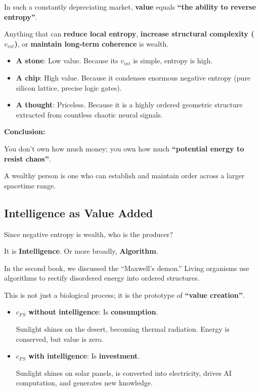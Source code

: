In such a constantly depreciating market, \textbf{value} equals \textbf{``the ability to reverse entropy''}.

Anything that can \textbf{reduce local entropy}, \textbf{increase structural complexity ($v_{int}$)}, or \textbf{maintain long-term coherence} is wealth.

\begin{itemize}
\item \textbf{A stone}: Low value. Because its $v_{int}$ is simple, entropy is high.

\item \textbf{A chip}: High value. Because it condenses enormous negative entropy (pure silicon lattice, precise logic gates).

\item \textbf{A thought}: Priceless. Because it is a highly ordered geometric structure extracted from countless chaotic neural signals.
\end{itemize}

\textbf{Conclusion:}

You don't own how much money; you own how much \textbf{``potential energy to resist chaos''}.

A wealthy person is one who can establish and maintain order across a larger spacetime range.

\subsection{Intelligence as Value Added}

Since negative entropy is wealth, who is the producer?

It is \textbf{Intelligence}. Or more broadly, \textbf{Algorithm}.

In the second book, we discussed the ``Maxwell's demon.'' Living organisms use algorithms to rectify disordered energy into ordered structures.

This is not just a biological process; it is the prototype of \textbf{``value creation''}.

\begin{itemize}
\item \textbf{$c_{FS}$ without intelligence}: Is \textbf{consumption}.

    Sunlight shines on the desert, becoming thermal radiation. Energy is conserved, but value is zero.

\item \textbf{$c_{FS}$ with intelligence}: Is \textbf{investment}.

    Sunlight shines on solar panels, is converted into electricity, drives AI computation, and generates new knowledge.
\end{itemize}

